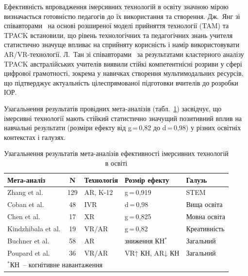 Ефективність впровадження імерсивних технологій в освіту значною мірою визначається готовністю педагогів до їх використання та створення. Дж.~Янг зі співавторами~\cite{Jang2021TAM} на основі розширеної моделі прийняття технології (TAM) та TPACK встановили, що рівень технологічних та педагогічних знань учителя статистично значуще впливає на сприйняту корисність і намір використовувати AR/VR-технології. Л.~Тан зі співавторами~\cite{Tan2023TPACK} за результатами кластерного аналізу TPACK австралійських учителів виявили стійкі компетентнісні розриви у сфері цифрової грамотності, зокрема у навичках створення мультимодальних ресурсів, що підтверджує актуальність цілеспрямованої підготовки вчителів до розробки ІОР.

Узагальнення результатів провідних мета-аналізів (табл.~\ref{tab:meta_analysis}) засвідчує, що імерсивні технології мають стійкий статистично значущий позитивний вплив на навчальні результати (розміри ефекту від g\,=\,0{,}82 до d\,=\,0{,}98) у різних освітніх контекстах і галузях.

\begin{table}[!h]
\centering
\caption{Узагальнення результатів мета-аналізів ефективності імерсивних технологій в освіті}
\label{tab:meta_analysis}
\small
\begin{tabular}{|p{3.5cm}|c|p{2cm}|p{2.5cm}|p{3cm}|}
\hline
\textbf{Мета-аналіз} & \textbf{N} & \textbf{Технологія} & \textbf{Розмір ефекту} & \textbf{Галузь} \\
\hline
Zhang et al. \cite{Omelchuk2024Secondary} & 129 & AR, K-12 & g\,=\,0{,}919 & STEM \\
\hline
Coban et al. \cite{Lytvynova2023Comparative} & 48 & IVR & d\,=\,0{,}98 & Вища освіта \\
\hline
Chen et al. \cite{Boiko2024Immersive} & 17 & XR & g\,=\,0{,}825 & Мовна освіта \\
\hline
Kindzhibala et al. \cite{Kindzhibala2025Creative} & 19 & VR/AR & g\,=\,0{,}82 & Креативність \\
\hline
Buchner et al. \cite{Buchner2021CogLoad} & 58 & AR & зниження КН$^{*}$ & Загальний \\
\hline
Poupard et al. \cite{Poupard2024Systematic} & 36 & VR/AR & VR↑ КН, AR↓ КН & Загальний \\
\hline
\multicolumn{5}{l}{\footnotesize $^{*}$КН~-- когнітивне навантаження} \\
\end{tabular}
\end{table}


